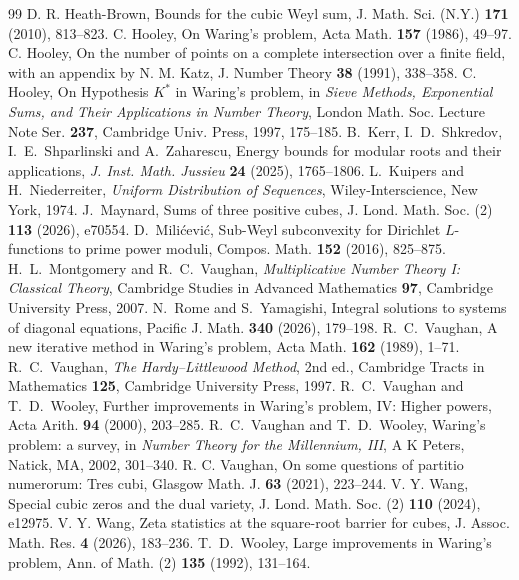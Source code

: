 \documentclass[11pt,letterpaper]{article}
\theoremstyle{definition}
\begin{document}
\begin{thebibliography}{99}
 D. R. Heath-Brown, Bounds for the cubic Weyl sum, J. Math. Sci. (N.Y.) \textbf{171} (2010), 813--823.
 C. Hooley, On Waring's problem, Acta Math. \textbf{157} (1986), 49--97.
 C. Hooley, On the number of points on a complete intersection over a finite field, with an appendix by N. M. Katz, J. Number Theory \textbf{38} (1991), 338--358.
 C. Hooley, On Hypothesis $K^*$ in Waring's problem, in \emph{Sieve Methods, Exponential Sums, and Their Applications in Number Theory}, London Math. Soc. Lecture Note Ser. \textbf{237}, Cambridge Univ. Press, 1997, 175--185.
B.~Kerr, I.~D.~Shkredov, I.~E.~Shparlinski and A.~Zaharescu,
Energy bounds for modular roots and their applications,
\emph{J. Inst. Math. Jussieu} \textbf{24} (2025), 1765--1806.
 L.~Kuipers and H.~Niederreiter, \emph{Uniform Distribution of Sequences}, Wiley-Interscience, New York, 1974.
 J.~Maynard, Sums of three positive cubes, J. Lond. Math. Soc. (2) \textbf{113} (2026), e70554.
 D.~Mili\'cevi\'c, Sub-Weyl subconvexity for Dirichlet $L$-functions to prime power moduli, Compos. Math. \textbf{152} (2016), 825--875.
 H.~L.~Montgomery and R.~C.~Vaughan, \emph{Multiplicative Number Theory I: Classical Theory}, Cambridge Studies in Advanced Mathematics \textbf{97}, Cambridge University Press, 2007.
 N.~Rome and S.~Yamagishi, Integral solutions to systems of diagonal equations, Pacific J. Math. \textbf{340} (2026), 179--198.
 R.~C.~Vaughan, A new iterative method in Waring's problem, Acta Math. \textbf{162} (1989), 1--71.
 R.~C.~Vaughan, \emph{The Hardy--Littlewood Method}, 2nd ed., Cambridge Tracts in Mathematics \textbf{125}, Cambridge University Press, 1997.
 R.~C.~Vaughan and T.~D.~Wooley, Further improvements in Waring's problem, IV: Higher powers, Acta Arith. \textbf{94} (2000), 203--285.
 R.~C.~Vaughan and T.~D.~Wooley, Waring's problem: a survey, in \emph{Number Theory for the Millennium, III}, A K Peters, Natick, MA, 2002, 301--340.
 R. C. Vaughan, On some questions of partitio numerorum: Tres cubi, Glasgow Math. J. \textbf{63} (2021), 223--244.
 V. Y. Wang, Special cubic zeros and the dual variety, J. Lond. Math. Soc. (2) \textbf{110} (2024), e12975.
 V. Y. Wang, Zeta statistics at the square-root barrier for cubes, J. Assoc. Math. Res. \textbf{4} (2026), 183--236.
 T.~D.~Wooley, Large improvements in Waring's problem, Ann. of Math. (2) \textbf{135} (1992), 131--164.

\end{thebibliography}
\end{document}
